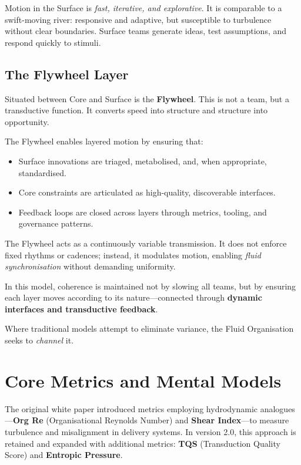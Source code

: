 \documentclass[12pt]{article}
\begin{document}
Motion in the Surface is \textit{fast, iterative, and explorative}. It is comparable to a swift-moving river: responsive and adaptive, but susceptible to turbulence without clear boundaries. Surface teams generate ideas, test assumptions, and respond quickly to stimuli.

\subsection*{The Flywheel Layer}

Situated between Core and Surface is the \textbf{Flywheel}. This is not a team, but a transductive function. It converts speed into structure and structure into opportunity.

The Flywheel enables layered motion by ensuring that:
\begin{itemize}
    \item Surface innovations are triaged, metabolised, and, when appropriate, standardised.
    \item Core constraints are articulated as high-quality, discoverable interfaces.
    \item Feedback loops are closed across layers through metrics, tooling, and governance patterns.
\end{itemize}

The Flywheel acts as a continuously variable transmission. It does not enforce fixed rhythms or cadences; instead, it modulates motion, enabling \textit{fluid synchronisation} without demanding uniformity.

In this model, coherence is maintained not by slowing all teams, but by ensuring each layer moves according to its nature—connected through \textbf{dynamic interfaces and transductive feedback}.

Where traditional models attempt to eliminate variance, the Fluid Organisation seeks to \textit{channel} it.


\section{Core Metrics and Mental Models}

The original white paper introduced metrics employing hydrodynamic analogues—\textbf{Org Re} (Organisational Reynolds Number) and \textbf{Shear Index}—to measure turbulence and misalignment in delivery systems. In version 2.0, this approach is retained and expanded with additional metrics: \textbf{TQS} (Transduction Quality Score) and \textbf{Entropic Pressure}.
\end{document}
